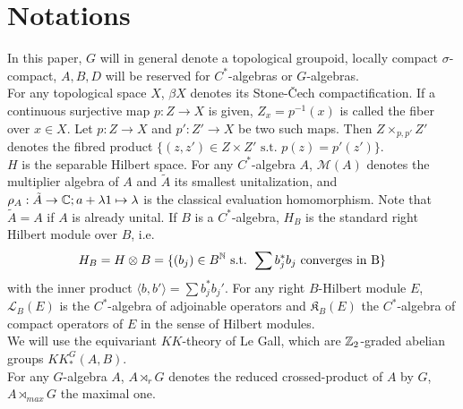 \section{Notations}

In this paper, $G$ will in general denote a topological groupoid, locally compact $\sigma$-compact, $A,B,D$ will be reserved for $C^*$-algebras or $G$-algebras.\\

For any topological space $X$, $\beta X$ denotes its Stone-\v{C}ech compactification. If a continuous surjective map $p : Z\rightarrow X $ is given, $Z_x = p^{-1}(x)$ is called the fiber over $x\in X$. Let $p : Z\rightarrow X $ and $p' : Z'\rightarrow X $ be two such maps. Then $Z\times_{p,p'} Z'$ denotes the fibred product $\{(z,z')\in Z\times Z' \text{ s.t. } p(z)=p'(z')\}$. \\ 

$H$ is the separable Hilbert space. For any $C^*$-algebra $A$, $\mathcal M(A)$ denotes the multiplier algebra of $A$ and $\tilde A$ its smallest unitalization, and $\rho_A : \tilde A \rightarrow \mathbb C; a+\lambda 1 \mapsto \lambda$ is the classical evaluation homomorphism. Note that $\tilde A=A$ if $A$ is already unital. If $B$ is a $C^*$-algebra, $H_B$ is the standard right Hilbert module over $B$, i.e. \[H_B= H\otimes B=\{(b_j)\in B^\mathbb N \text{ s.t. }\sum b_j^* b_j \text{ converges in B}\}\] with the inner product $\langle b, b'\rangle = \sum b_j^* b_j'$. For any right $B$-Hilbert module $E$, $\mathcal L_B(E)$ is the $C^*$-algebra of adjoinable operators and $\mathfrak K_B(E)$ the $C^*$-algebra of compact operators of $E$ in the sense of Hilbert modules.\\

We will use the equivariant $KK$-theory of Le Gall, which are $\mathbb Z_2$-graded abelian groups $KK^G_*(A,B)$.\\

For any $G$-algebra $A$, $A\rtimes_r G$ denotes the reduced crossed-product of $A$ by $G$, $A\rtimes_{max} G$ the maximal one. 
